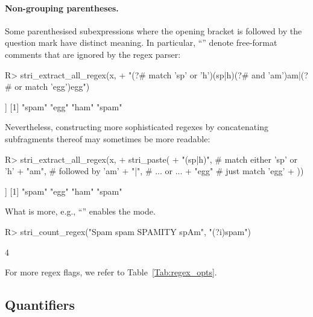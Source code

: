 \documentclass[nojss]{jss}
\newcommand{\str}[1]{\code{{#1}}}
\begin{document}
\paragraph{Non-grouping parentheses.}
Some parenthesised subexpressions where the opening bracket is followed by
the question mark have distinct meaning.
In particular, ``\str{(?\#...)}'' denote free-format comments
that are ignored by the regex parser:

\begin{Schunk}
\begin{Sinput}
R> stri_extract_all_regex(x,
+     "(?# match 'sp' or 'h')(sp|h)(?# and 'am')am|(?# or match 'egg')egg")
\end{Sinput}
\begin{Soutput}
[[1]]
[1] "spam" "egg"  "ham"  "spam"
\end{Soutput}
\end{Schunk}

\noindent
Nevertheless, constructing more sophisticated regexes by concatenating
subfragments thereof may sometimes be more readable:

\begin{Schunk}
\begin{Sinput}
R> stri_extract_all_regex(x,
+      stri_paste(
+              "(sp|h)",   # match either 'sp' or 'h'
+              "am",       # followed by 'am'
+          "|",            # ... or ...
+              "egg"       # just match 'egg'
+  ))
\end{Sinput}
\begin{Soutput}
[[1]]
[1] "spam" "egg"  "ham"  "spam"
\end{Soutput}
\end{Schunk}


What is more, e.g., ``\str{(?i)}'' enables the 
mode.

\begin{Schunk}
\begin{Sinput}
R> stri_count_regex("Spam spam SPAMITY spAm", "(?i)spam")
\end{Sinput}
\begin{Soutput}
[1] 4
\end{Soutput}
\end{Schunk}

For more regex flags, we refer to Table~\ref{Tab:regex_opts}.




\subsection{Quantifiers}
\end{document}
